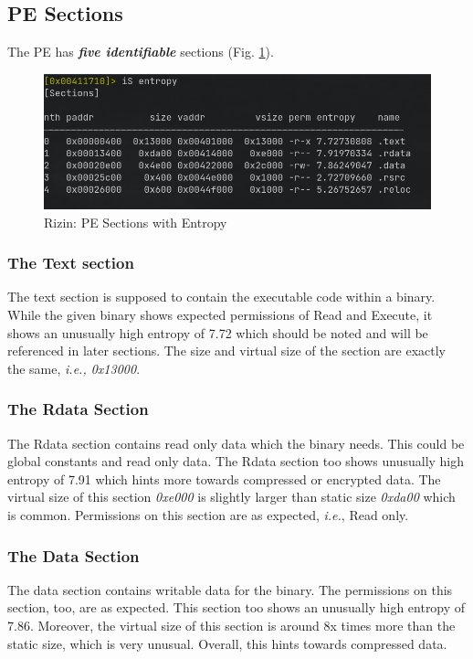 \documentclass[10pt,a4paper]{article}
\begin{document}
\subsection{PE Sections}
The PE has \textbf{\textit{five identifiable}} sections (Fig. \ref{rizin_sections}).
\begin{figure}[!htbp]%
	\centering
	\includegraphics[width=\columnwidth]{pics/rizin_section.png}
	\caption{Rizin: PE Sections with Entropy}
	\label{rizin_sections}
\end{figure}

	\subsubsection{The Text section}
		The text section is supposed to contain the executable code within a binary.
		While the given binary shows expected permissions of Read and Execute,
		it shows an unusually high entropy of 7.72 which should be noted and will be referenced in later sections.
		The size and virtual size of the section are exactly the same, \textit{i.e., 0x13000}.

	\subsubsection{The Rdata Section}
		The Rdata section contains read only data which the binary needs.
		This could be global constants and read only data.
		The Rdata section too shows unusually high entropy of 7.91 which hints more towards compressed or encrypted data.
		The virtual size of this section \textit{0xe000} is slightly larger than static size \textit{0xda00} which is common.
		Permissions on this section are as expected, \textit{i.e.}, Read only.

	\subsubsection{The Data Section}
		The data section contains writable data for the binary. The permissions on this section, too, are as expected.
		This section too shows an unusually high entropy of 7.86.
		Moreover, the virtual size of this section is around 8x times more than the static size, which is very unusual.
		Overall, this hints towards compressed data.
\end{document}
